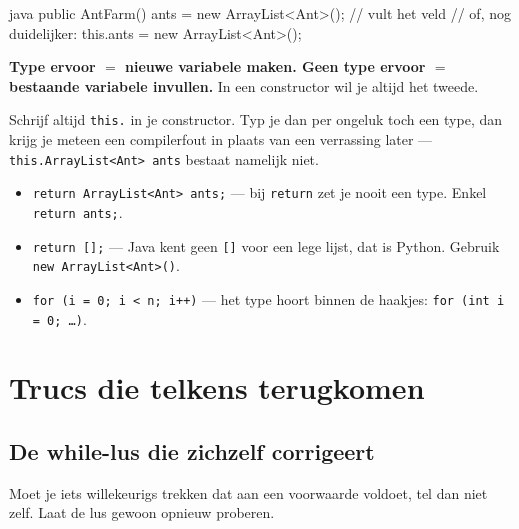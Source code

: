 \documentclass[a4paper,11pt]{article}
\begin{document}
\begin{codeblock}[JUIST]{java}
    public AntFarm()
    {
            ants = new ArrayList<Ant>();       // vult het veld
            // of, nog duidelijker:
            this.ants = new ArrayList<Ant>();
        }
\end{codeblock}

\begin{conceptbox}
    \textbf{Type ervoor $=$ nieuwe variabele maken. Geen type ervoor $=$ bestaande
        variabele invullen.} In een constructor wil je altijd het tweede.
\end{conceptbox}

Schrijf altijd \texttt{this.} in je constructor. Typ je dan per ongeluk toch een
type, dan krijg je meteen een compilerfout in plaats van een verrassing later ---
\texttt{this.ArrayList<Ant> ants} bestaat namelijk niet.

\begin{warningbox}
    \begin{itemize}
        \item \texttt{return ArrayList<Ant> ants;} --- bij \texttt{return} zet je nooit
              een type. Enkel \texttt{return ants;}.
        \item \texttt{return [];} --- Java kent geen \texttt{[]} voor een lege lijst,
              dat is Python. Gebruik \texttt{new ArrayList<Ant>()}.
        \item \texttt{for (i = 0; i < n; i++)} --- het type hoort binnen de haakjes:
              \texttt{for (int i = 0; \dots)}.
    \end{itemize}
\end{warningbox}

\section{Trucs die telkens terugkomen}

\subsection{De while-lus die zichzelf corrigeert}

Moet je iets willekeurigs trekken dat aan een voorwaarde voldoet, tel dan niet
zelf. Laat de lus gewoon opnieuw proberen.
\end{document}

